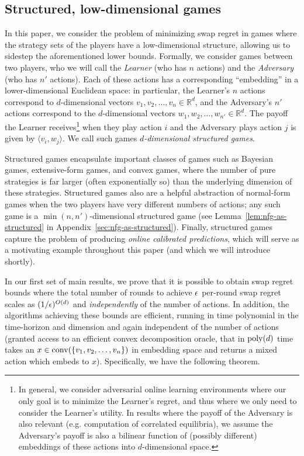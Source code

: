 \documentclass[final,12pt]{alt2025}
\begin{document}
\subsection{Structured, low-dimensional games}

In this paper, we consider the problem of minimizing swap regret in games where the strategy sets of the players have a low-dimensional structure, allowing us to sidestep the aforementioned lower bounds. Formally, we consider games between two players, who we will call the \emph{Learner} (who has $n$ actions) and the \emph{Adversary} (who has $n'$ actions). Each of these actions has a corresponding ``embedding'' in a lower-dimensional Euclidean space: in particular, the Learner's $n$ actions correspond to $d$-dimensional vectors $v_1, v_2, \dots, v_n \in \mathbb{R}^d$, and the Adversary's $n'$ actions correspond to the $d$-dimensional vectors $w_1, w_2, \dots, w_{n'} \in \mathbb{R}^{d}$. The payoff the Learner receives\footnote{In general, we consider adversarial online learning environments where our only goal is to minimize the Learner's regret, and thus where we only need to consider the Learner's utility. In results where the payoff of the Adversary is also relevant (e.g. computation of correlated equilibria), we assume the Adversary's payoff is also a bilinear function of (possibly different) embeddings of these actions into $d$-dimensional space.} when they play action $i$ and the Adversary plays action $j$ is given by $\langle v_i, w_j\rangle$. We call such games \emph{$d$-dimensional structured games}.

Structured games encapsulate important classes of games such as Bayesian games, extensive-form games, and convex games, where the number of pure strategies is far larger (often exponentially so) than the underlying dimension of these strategies. Structured games also are a helpful abstraction of normal-form games when the two players have very different numbers of actions; any such game is a $\min(n, n')$-dimensional structured game (see Lemma~\ref{lem:nfg-as-structured} in Appendix~\ref{sec:nfg-as-structured}). Finally, structured games capture the problem of producing \emph{online calibrated predictions}, which will serve as a motivating example throughout this paper (and which we will introduce shortly). 

In our first set of main results, we prove that it is possible to obtain swap regret bounds where the total number of rounds to achieve $\epsilon$ per-round swap regret scales as $(1/\epsilon)^{O(d)}$ and \emph{independently} of the number of actions. In addition, the algorithms achieving these bounds are efficient, running in time polynomial in the time-horizon and dimension and again independent of the number of actions (granted access to an efficient convex decomposition oracle, that in $\operatorname{poly}(d)$ time takes an $x \in \mathrm{conv}(\{v_1, v_2, \dots, v_n\})$ in embedding space and returns a mixed action which embeds to $x$). Specifically, we have the following theorem.
\end{document}
